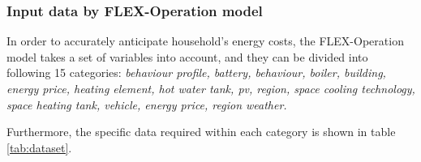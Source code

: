 \subsubsection{Input data by FLEX-Operation model}

In order to accurately anticipate household's energy costs,
the FLEX-Operation model takes a set of variables into account,
and they can be divided into following 15 categories: 
\emph{
    behaviour profile,
    battery,
    behaviour, 
    boiler,
    building,
    energy price,
    heating element, 
    hot water tank,
    \gls{pv},
    region,
    space cooling technology,
    space heating tank,
    vehicle,
    energy price,
    region weather. 
}

Furthermore, the specific data required within each category is shown in table \ref{tab:dataset}. 


